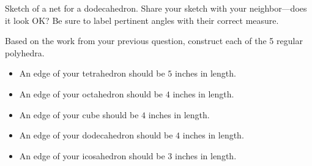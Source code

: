\begin{prob}
Sketch of a net for a dodecahedron. Share your sketch with your
neighbor---does it look OK? Be sure to label pertinent angles with
their correct measure.
\end{prob}

\begin{prob}
Based on the work from your previous question, construct each of the 5
regular polyhedra. 
\begin{itemize}
\item An edge of your tetrahedron should be $5$ inches in length. 
\item An edge of your octahedron should be $4$ inches in length.
\item An edge of your cube should be $4$ inches in length.
\item An edge of your dodecahedron should be $4$ inches in length.
\item An edge of your icosahedron should be $3$ inches in length.
\end{itemize}
\end{prob}
